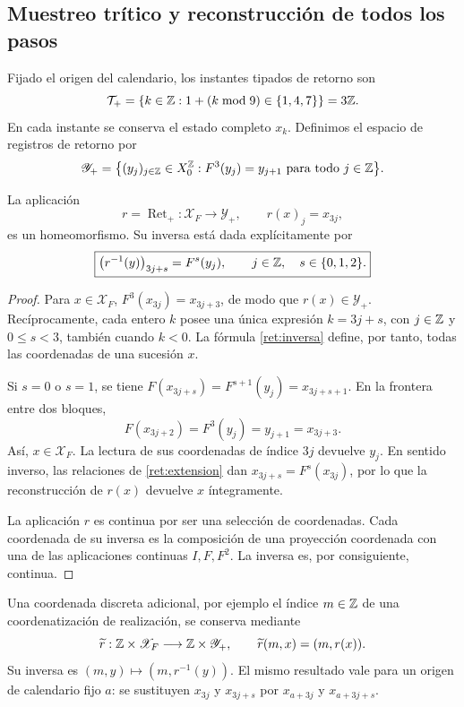 \subsection{Muestreo trítico y reconstrucción de todos los pasos}

Fijado el origen del calendario, los instantes tipados de retorno son
\[
 \mathcal T_+
 =\{k\in\mathbb Z:1+(k\bmod 9)\in\{1,4,7\}\}=3\mathbb Z.
\]
En cada instante se conserva el estado completo \(x_k\).
Definimos el espacio de registros de retorno por
\begin{equation}
 \mathscr Y_+
 =\bigl\{(y_j)_{j\in\mathbb Z}\in X_0^{\mathbb Z}:
                 F^3(y_j)=y_{j+1}\text{ para todo }j\in\mathbb Z\bigr\}.
 \label{ret:registros}
\end{equation}

\begin{theorem}
\label{ret:homeomorfismo}
La aplicación
\[
 r=\operatorname{Ret}_+:\mathscr X_F\longrightarrow\mathscr Y_+,
 \qquad r(x)_j=x_{3j},
\]
es un homeomorfismo. Su inversa está dada explícitamente por
\begin{equation}
 \boxed{
  \bigl(r^{-1}(y)\bigr)_{3j+s}=F^s(y_j),
  \qquad j\in\mathbb Z,\quad s\in\{0,1,2\}.}
 \label{ret:inversa}
\end{equation}
\end{theorem}
\begin{proof}
Para \(x\in\mathscr X_F\),
\(F^3(x_{3j})=x_{3j+3}\), de modo que \(r(x)\in\mathscr Y_+\).
Recíprocamente, cada entero \(k\) posee una única expresión
\(k=3j+s\), con \(j\in\mathbb Z\) y \(0\le s<3\), también cuando
\(k<0\). La fórmula \eqref{ret:inversa} define, por tanto, todas las
coordenadas de una sucesión \(x\).

Si \(s=0\) o \(s=1\), se tiene
\(F(x_{3j+s})=F^{s+1}(y_j)=x_{3j+s+1}\).
En la frontera entre dos bloques,
\[
 F(x_{3j+2})=F^3(y_j)=y_{j+1}=x_{3j+3}.
\]
Así, \(x\in\mathscr X_F\).
La lectura de sus coordenadas de índice \(3j\) devuelve \(y_j\).
En sentido inverso, las relaciones de \eqref{ret:extension} dan
\(x_{3j+s}=F^s(x_{3j})\), por lo que la reconstrucción de \(r(x)\)
devuelve \(x\) íntegramente.

La aplicación \(r\) es continua por ser una selección de coordenadas.
Cada coordenada de su inversa es la composición de una proyección
coordenada con una de las aplicaciones continuas \(I,F,F^2\).
La inversa es, por consiguiente, continua.
\end{proof}

Una coordenada discreta adicional, por ejemplo el índice \(m\in\mathbb Z\)
de una coordenatización de realización, se conserva mediante
\[
 \widetilde r:\mathbb Z\times\mathscr X_F
 \longrightarrow\mathbb Z\times\mathscr Y_+,
 \qquad \widetilde r(m,x)=(m,r(x)).
\]
Su inversa es \((m,y)\mapsto(m,r^{-1}(y))\).
El mismo resultado vale para un origen de calendario fijo \(a\):
se sustituyen \(x_{3j}\) y \(x_{3j+s}\) por
\(x_{a+3j}\) y \(x_{a+3j+s}\).

